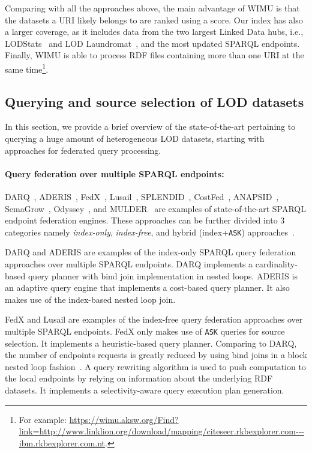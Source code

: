 \documentclass[sw]{iosart2x}
\begin{document}
Comparing with all the approaches above, the main advantage of WIMU is that the datasets a URI likely belongs to are ranked using a score.
Our index has also a larger coverage, as it includes data from the two largest Linked Data hubs, i.e., LODStats~\cite{auer2012lodstats} and LOD Laundromat~\cite{beek2014lod}, and the most updated SPARQL endpoints.
Finally, WIMU is able to process RDF files containing more than one URI at the same time\footnote{For example: \url{https://wimu.aksw.org/Find?link=http://www.linklion.org/download/mapping/citeseer.rkbexplorer.com---ibm.rkbexplorer.com.nt}.}.

\subsection{Querying and source selection of LOD datasets}
In this section, we provide a brief overview of the state-of-the-art pertaining to querying a huge amount of heterogeneous LOD datasets, starting with approaches for federated query processing.

\paragraph*{\textbf{Query federation over multiple SPARQL endpoints:}}
DARQ~\cite{darq2008}, ADERIS~\cite{aderis2011}, FedX~\cite{fedx2011}, Lusail~\cite{abdelaziz2017lusail}, SPLENDID~\cite{splendid2011}, CostFed~\cite{saleem2018costfed}, ANAPSID~\cite{anapsid2011}, SemaGrow~\cite{semagrow2015}, Odyssey~\cite{odyssey2017}, and MULDER~\cite{endris2018querying} are examples of state-of-the-art SPARQL endpoint federation engines.
These approaches can be further divided into 3 categories namely \emph{index-only}, \emph{index-free}, and hybrid (index+\texttt{ASK}) approaches~\cite{saleem2015fine}.

DARQ and ADERIS are examples of the index-only SPARQL query federation approaches over multiple SPARQL endpoints.
DARQ implements a cardinality-based query planner with bind join implementation in nested loops.
ADERIS is an adaptive query engine that implements a cost-based query planner.
It also makes use of the index-based nested loop join.

FedX and Lusail are examples of the index-free query federation approaches over multiple SPARQL endpoints.
FedX only makes use of \texttt{ASK} queries for source selection.
It implements a heuristic-based query planner.
Comparing to DARQ, the number of endpoints requests is greatly reduced by using bind joins in a block nested loop fashion~\cite{fedx2011}.
A query rewriting algorithm is used to push computation to the local endpoints by relying on information about the underlying RDF datasets.
It implements a selectivity-aware query execution plan generation.
\end{document}
